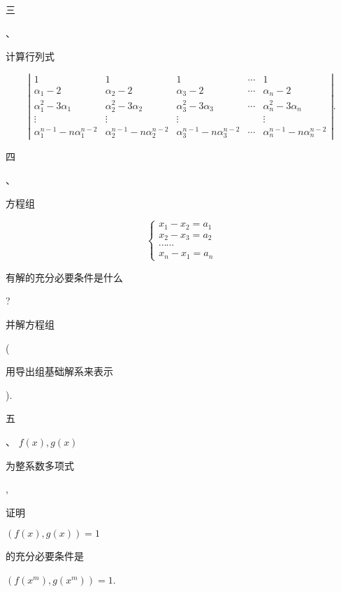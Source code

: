 \documentclass[10pt]{article}
\begin{document}
\begin{CJK}{UTF8}{mj}三\end{CJK}、 \begin{CJK}{UTF8}{mj}计算行列式\end{CJK}
$$
\left|\begin{array}{ccccc}
1 & 1 & 1 & \cdots & 1 \\
\alpha_{1}-2 & \alpha_{2}-2 & \alpha_{3}-2 & \cdots & \alpha_{n}-2 \\
\alpha_{1}^{2}-3 \alpha_{1} & \alpha_{2}^{2}-3 \alpha_{2} & \alpha_{3}^{2}-3 \alpha_{3} & \cdots & \alpha_{n}^{2}-3 \alpha_{n} \\
\vdots & \vdots & \vdots & & \vdots \\
\alpha_{1}^{n-1}-n \alpha_{1}^{n-2} & \alpha_{2}^{n-1}-n \alpha_{2}^{n-2} & \alpha_{3}^{n-1}-n \alpha_{3}^{n-2} & \cdots & \alpha_{n}^{n-1}-n \alpha_{n}^{n-2}
\end{array}\right| .
$$
\begin{CJK}{UTF8}{mj}四\end{CJK}、\begin{CJK}{UTF8}{mj}方程组\end{CJK}
$$
\left\{\begin{array}{l}
x_{1}-x_{2}=a_{1} \\
x_{2}-x_{3}=a_{2} \\
\cdots \cdots \\
x_{n}-x_{1}=a_{n}
\end{array}\right.
$$
\begin{CJK}{UTF8}{mj}有解的充分必要条件是什么\end{CJK}? \begin{CJK}{UTF8}{mj}并解方程组\end{CJK} (\begin{CJK}{UTF8}{mj}用导出组基础解系来表示\end{CJK}).

\begin{CJK}{UTF8}{mj}五\end{CJK}、 $f(x), g(x)$ \begin{CJK}{UTF8}{mj}为整系数多项式\end{CJK}, \begin{CJK}{UTF8}{mj}证明\end{CJK} $(f(x), g(x))=1$ \begin{CJK}{UTF8}{mj}的充分必要条件是\end{CJK} $\left(f\left(x^{m}\right), g\left(x^{m}\right)\right)=1$.
\end{document}
